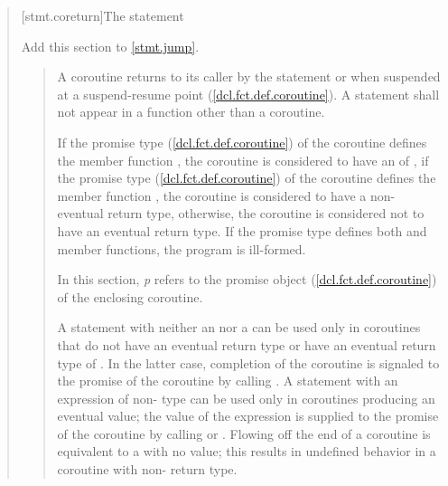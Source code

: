\begin{quote}
%
%
%
%

[stmt.coreturn]{The  statement}%

Add this section to \ref{stmt.jump}.

\begin{quote}

\pnum
A coroutine returns to its caller by the  statement
or when suspended at a suspend-resume point (\ref{dcl.fct.def.coroutine}). A  statement shall not appear in a function other than a coroutine.

\pnum
  If the promise type (\ref{dcl.fct.def.coroutine}) of the coroutine defines the member function , the coroutine is considered to have an  of , if the promise type (\ref{dcl.fct.def.coroutine}) of the coroutine defines the member function , the coroutine is considered to have a non- eventual return  type, otherwise, the coroutine is considered not to have an eventual return type. If the promise type defines both  and  member functions, the program is ill-formed.

\pnum
In this section, \textit{p} refers to the promise object  
(\ref{dcl.fct.def.coroutine})
of the enclosing coroutine.

\pnum
A  statement
with neither an  nor a 
can be used only in coroutines
that do not have an eventual return type or have an eventual return type of . In the latter case, completion of the coroutine
is signaled to the promise of the coroutine by calling .
A  statement with an expression of non- type can be used only
in coroutines producing an eventual value; the value of the expression is supplied to the promise of the coroutine by calling 
 or
. Flowing off the end of a coroutine is equivalent to a  with no value; this results in undefined
behavior in a coroutine with non- return type.


\end{quote}
\end{quote}
